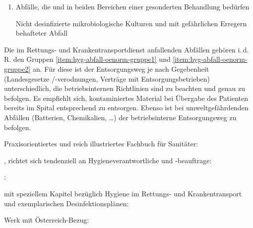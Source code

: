 \begin{enumerate}
\begin{enumerate}
    Die Sammlung und der Transport dieser Abfälle haben in
    ausreichend dichten Gebinden bzw. Transportbehältern zu
    erfolgen.
    
    Plasma, Infusionslösungen,  und  sind
    unter Berücksichtigung der wasserrechtlichen
    Bestimmungen wie  zu behandeln. Bei der
    Entleerung der Gebinde sind die entsprechenden
    Hygienemaßnahmen einzuhalten.
  \end{enumerate}
  \item Abfälle, die  und in
  beiden Bereichen einer gesonderten Behandlung bedürfen
  \label{item:hyg-abfall-oenorm-gruppe3}
  
  Nicht desinfizierte mikrobiologische Kulturen und mit
  gefährlichen Erregern behafteter Abfall
  
\end{enumerate}
Die im Rettungs- und Krankentransportdienst anfallenden
Abfällen gehören i.\,d.\,R. den Gruppen
\ref{item:hyg-abfall-oenorm-gruppe1} und
\ref{item:hyg-abfall-oenorm-gruppe2} an. Für diese ist
der Entsorgungsweg je nach Gegebenheit (Landesgesetze
/-verodnungen, Verträge mit Entsorgungsbetrieben)
unterschiedlich, die betriebsinternen
Richtlinien sind zu beachten und genau zu befolgen. Es
empfiehlt sich, kontaminiertes Material bei Übergabe des
Patienten bereits im Spital entsprechend zu entsorgen.
Ebenso ist bei umweltgefährdenden Abfällen (Batterien,
Chemikalien, \ldots) der betriebsinterne Entsorgungsweg zu
befolgen.

\nocite{KayserMikrobiologie10}
\nocite{HahnMikrobio6}
\nocite{BLIM3}
\nocite{OHCSP7}
\nocite{OeAG2007}


\begin{Literary}
  Praxisorientiertes und
  reich illustriertes Fachbuch für Sanitäter:
  {}


  , richtet sich
  tendenziell an Hygieneverantwortliche und -beauftrage:
  {}

 :
  {}

  mit
  speziellem Kapitel bezüglich Hygiene im Rettungs- und
  Krankentransport und exemplarischen
  Desinfektionsplänen:
  {}

 Werk mit Österreich-Bezug:
  {}
\end{Literary}


\ChapterBibliography

\ChapterEnd